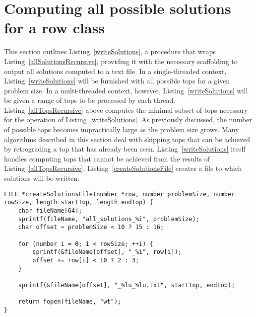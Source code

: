 \section{Computing all possible solutions for a row class}

This section outlines Listing~\ref{writeSolutions}, a procedure that wraps Listing~\ref{allSolutionsRecursive}, providing it with the necessary scaffolding to output all solutions computed to a text file. In a single-threaded context, Listing~\ref{writeSolutions} will be furnished with all possible tops for a given problem size. In a multi-threaded context, however, Listing~\ref{writeSolutions} will be given a range of tops to be processed by each thread. Listing~\ref{allTopsRecursive} above computes the minimal subset of tops necessary for the operation of Listing~\ref{writeSolutions}. As previously discussed, the number of possible tops becomes impractically large as the problem size grows. Many algorithms described in this section deal with skipping tops that can be achieved by retrograding a top that has already been seen. Listing~\ref{writeSolutions} itself handles computing tops that cannot be achieved from the results of Listing~\ref{allTopsRecursive}. Listing~\ref{createSolutionsFile} creates a file to which solutions will be written.

\begin{lstlisting}[caption={Creating a text file to hold all thread-specific solutions.},label={createSolutionsFile}]
FILE *createSolutionsFile(number *row, number problemSize, number rowSize, length startTop, length endTop) {
    char fileName[64];
    sprintf(fileName, "all_solutions_%i", problemSize);
    char offset = problemSize < 10 ? 15 : 16;

    for (number i = 0; i < rowSize; ++i) {
        sprintf(&fileName[offset], "_%i", row[i]);
        offset += row[i] < 10 ? 2 : 3;
    }

    sprintf(&fileName[offset], "_%lu_%lu.txt", startTop, endTop);

    return fopen(fileName, "wt");
}
\end{lstlisting}

